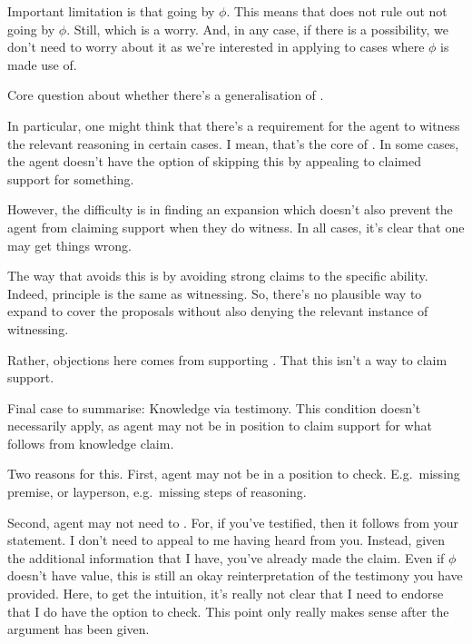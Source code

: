 \begin{note}
  Important limitation is that going by \(\phi\).
  This means that \nI{} does not rule out not going by \(\phi\).
  Still, \expec{} which is a worry.
  And, in any case, if there is a possibility, we don't need to worry about it as we're interested in applying \nI{} to cases where \(\phi\) is made use of.
\end{note}

\begin{note}[Generalising \nI{}]
  Core question about whether there's a generalisation of \nI{}.

  In particular, one might think that there's a requirement for the agent to witness the relevant reasoning in certain cases.
  I mean, that's the core of \nI{}.
  In some cases, the agent doesn't have the option of skipping this by appealing to claimed support for something.

  However, the difficulty is in finding an expansion which doesn't also prevent the agent from claiming support when they do witness.
  In all cases, it's clear that one may get things wrong.

  The way that \adB{} avoids this is by avoiding strong claims to the specific ability.
  Indeed, principle is the same as witnessing.
  So, there's no plausible way to expand \nI{} to cover the proposals without also denying the relevant instance of witnessing.

  Rather, objections here comes from supporting \ESU{}.
  That this isn't a way to claim support.
\end{note}

\begin{note}
  Final case to summarise:
  Knowledge via testimony.
  This condition doesn't necessarily apply, as agent may not be in position to claim support for what follows from knowledge claim.

  Two reasons for this.
  First, agent may not be in a position to check.
  E.g.\ missing premise, or layperson, e.g.\ missing steps of reasoning.

  Second, agent may not need to \RBV{-}.
  For, if you've testified, then it follows from your statement.
  I don't need to appeal to me having heard from you.
  Instead, given the additional information that I have, you've already made the claim.
  Even if \(\phi\) doesn't have value, this is still an okay reinterpretation of the testimony you have provided.
  Here, to get the intuition, it's really not clear that I need to endorse that I do have the option to check.
  {
    \color{red}
    This point only really makes sense after the argument has been given.
  }
\end{note}


